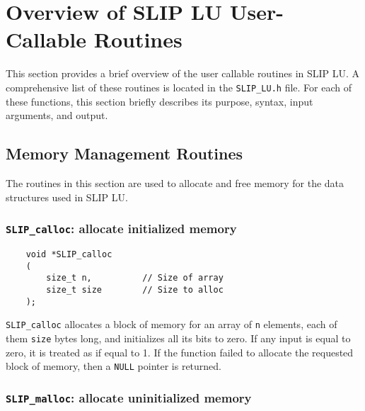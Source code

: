 \documentclass[11pt]{article}
\theoremstyle{definition}
\begin{document}
\cprotect\section{Overview of SLIP LU User-Callable Routines}
\label{s:UserRoutines}

This section provides a brief overview of the user callable routines in SLIP
LU. A comprehensive list of these routines is located in the \verb|SLIP_LU.h|
file. For each of these functions, this section briefly describes its purpose,
syntax, input arguments, and output.

\subsection{Memory Management Routines} \label{s:user:memmanag}

The routines in this section are used to allocate and free memory for the data
structures used in SLIP LU.

\cprotect\subsubsection{\verb|SLIP_calloc|: allocate initialized memory}
\label{ss:SLIP_calloc}

\begin{mdframed}[userdefinedwidth=6in]
{\footnotesize
\begin{verbatim}
    void *SLIP_calloc
    (
        size_t n,          // Size of array
        size_t size        // Size to alloc
    );
\end{verbatim}
} \end{mdframed}

\verb|SLIP_calloc| allocates a block of memory for an array of \verb|n|
elements, each of them \verb|size| bytes long, and initializes all its bits to
zero.  If any input is equal to zero, it is treated as if equal to 1.  If the
function failed to allocate the requested block of memory, then a \verb|NULL|
pointer is returned.

\cprotect\subsubsection{\verb|SLIP_malloc|: allocate uninitialized memory}
\label{ss:SLIP_malloc}
\end{document}
